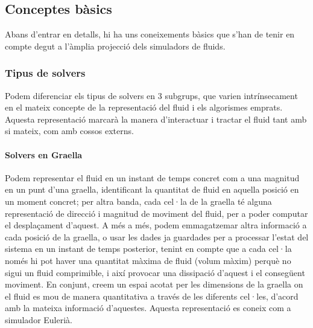 \documentclass[a4paper]{report}
\begin{document}
	\subsection{Conceptes bàsics}
	Abans d'entrar en detalls, hi ha uns coneixements bàsics que s'han de tenir en compte degut a l'àmplia projecció dels simuladors de fluids.
	\subsubsection[Tipus de solvers]{Tipus de solvers}
	Podem diferenciar els tipus de solvers en 3 subgrups, que varien intrínsecament en el mateix concepte de la representació del fluid i els algorismes emprats. Aquesta representació marcarà la manera d'interactuar i tractar el fluid tant amb si mateix, com amb cossos externs.
	
	\paragraph[Graella]{Solvers en Graella} Podem representar el fluid en un instant de temps concret com a una magnitud en un punt d'una graella, identificant la quantitat de fluid en aquella posició en un moment concret; per altra banda, cada cel·la de la graella té alguna representació de direcció i magnitud de moviment del fluid, per a poder computar el desplaçament d'aquest. \newline
	A més a més, podem emmagatzemar altra informació a cada posició de la graella, o usar les dades ja guardades per a processar l'estat del sistema en un instant de temps posterior, tenint en compte que a cada cel·la només hi pot haver una quantitat màxima de fluid (volum màxim) perquè no sigui un fluid comprimible, i així provocar una dissipació d'aquest i el consegüent moviment.\newline
	En conjunt, creem un espai acotat per les dimensions de la graella on el fluid es mou de manera quantitativa a través de les diferents cel·les, d'acord amb la mateixa informació d'aquestes. \newline
	Aquesta representació es coneix com a simulador Eulerià.
	
\end{document}
